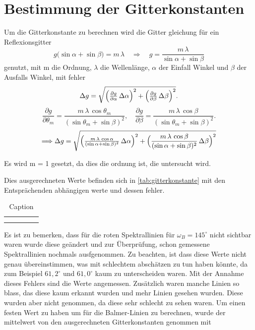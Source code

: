 \section{Bestimmung der Gitterkonstanten}
Um die Gitterkonstante zu berechnen wird die Gitter gleichung für ein Reflexionsgitter 
\begin{equation}
  g\bigl(\sin\alpha + \sin\beta\bigr) = m\,\lambda
  \quad\Longrightarrow\quad
  g = \frac{m\,\lambda}{\sin\alpha + \sin\beta}
  \label{Gittergleichung}
\end{equation}
genutzt, mit m die Ordnung, $\lambda$ die Wellenlänge, $\alpha$ der Einfall Winkel und $\beta$ der Ausfalls Winkel, mit fehler
\begin{equation}
  \Delta g
  = \sqrt{
    \Bigl(\tfrac{\partial g}{\partial\alpha}\,\Delta\alpha\Bigr)^{2}
   +\Bigl(\tfrac{\partial g}{\partial\beta}\,\Delta\beta\Bigr)^{2}
  }.
  \label{Gitterfgleichung fehler}
\end{equation}
\begin{equation}
  \frac{\partial g}{\partial\theta_m}
  = \frac{m\,\lambda\,\cos\theta_m}{(\sin\theta_m + \sin\beta)^{2}},
  \quad
  \frac{\partial g}{\partial\beta}
  = \frac{m\,\lambda\,\cos\beta}{(\sin\theta_m + \sin\beta)^{2}}.
\end{equation}
\begin{equation}
    \Longrightarrow \Delta g = \sqrt{\Bigl(\tfrac{m\,\lambda\,\cos{\alpha}}{(\sin{\alpha}+\sin{\beta})^2}\,\Delta\alpha\Bigr)^2 + \Bigl(\frac{m\,\lambda\,\cos{\beta}}{(\sin{\alpha} + \sin{\beta})^2}\,\Delta\beta\Bigr)^2}
\end{equation}

Es wird m = 1 gesetzt, da dies die ordnung ist, die untersucht wird.


Dies ausgerechneten Werte befinden sich in \cref{tab:gitterkonstante} mit den Entsprächenden abhängigen werte und dessen fehler.
\begin{table}[htbp]
    \centering
    \begin{tabular}{|c|c|c|c|c|}
        
         &  \\
         & 
    \end{tabular}
    \caption{Caption}
    \label{tab:my_label}
\end{table}
Es ist zu bemerken, dass für die roten Spektrallinien für $\omega_B = 145^\circ$ nicht sichtbar waren wurde diese geändert und zur Überprüfung, schon gemessene Spektrallinien nochmals ausfgenommen. 
Zu beachten, ist dass diese Werte nicht genau übereinstimmen, was mit schlechtem abschätzen zu tun haben könnte, da zum Beispiel $61,2^\circ$ und $61,0^\circ$ kaum zu unterscheiden waren.
Mit der Annahme dieses Fehlers sind die Werte angemessen.
Zusätzlich waren manche Linien so blass, das diese kaum erkannt wurden und mehr Linien gesehen wurden. 
Diese wurden aber nicht genommen, da diese sehr schlecht zu sehen waren. 
Um einen festen Wert zu haben um für die Balmer-Linien zu berechnen, wurde der mittelwert von den ausgerechneten Gitterkonstanten genommen mit 

